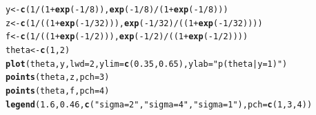 \documentclass[12pt]{article}\usepackage[]{graphicx}\usepackage[]{color}
\makeatletter
\newcommand{\hlnum}[1]{\textcolor[rgb]{0.686,0.059,0.569}{#1}}%
\newcommand{\hlstr}[1]{\textcolor[rgb]{0.192,0.494,0.8}{#1}}%
\newcommand{\hlopt}[1]{\textcolor[rgb]{0,0,0}{#1}}%
\newcommand{\hlstd}[1]{\textcolor[rgb]{0.345,0.345,0.345}{#1}}%
\newcommand{\hlkwb}[1]{\textcolor[rgb]{0.69,0.353,0.396}{#1}}%
\newcommand{\hlkwc}[1]{\textcolor[rgb]{0.333,0.667,0.333}{#1}}%
\newcommand{\hlkwd}[1]{\textcolor[rgb]{0.737,0.353,0.396}{\textbf{#1}}}%
\newenvironment{kframe}{%
 \def\at@end@of@kframe{}%
 \ifinner\ifhmode%
  \def\at@end@of@kframe{\end{minipage}}%
  \begin{minipage}{\columnwidth}%
 \fi\fi%
 \def\FrameCommand##1{\hskip\@totalleftmargin \hskip-\fboxsep
 \colorbox{shadecolor}{##1}\hskip-\fboxsep
     \hskip-\linewidth \hskip-\@totalleftmargin \hskip\columnwidth}%
 \MakeFramed {\advance\hsize-\width
   \@totalleftmargin\z@ \linewidth\hsize
   \@setminipage}}%
 {\par\unskip\endMakeFramed%
 \at@end@of@kframe}
\newenvironment{knitrout}{}{} %
\makeatother
\begin{document}
\begin{knitrout}\footnotesize
{}\color{fgcolor}\begin{kframe}
\begin{alltt}
\hlstd{y} \hlkwb{<-} \hlkwd{c}\hlstd{(}\hlnum{1}\hlopt{/}\hlstd{(}\hlnum{1}\hlopt{+}\hlkwd{exp}\hlstd{(}\hlopt{-}\hlnum{1}\hlopt{/}\hlnum{8}\hlstd{)),} \hlkwd{exp}\hlstd{(}\hlopt{-}\hlnum{1}\hlopt{/}\hlnum{8}\hlstd{)}\hlopt{/}\hlstd{(}\hlnum{1}\hlopt{+}\hlkwd{exp}\hlstd{(}\hlopt{-}\hlnum{1}\hlopt{/}\hlnum{8}\hlstd{)))}
\hlstd{z} \hlkwb{<-} \hlkwd{c}\hlstd{(}\hlnum{1}\hlopt{/}\hlstd{((}\hlnum{1}\hlopt{+}\hlkwd{exp}\hlstd{(}\hlopt{-}\hlnum{1}\hlopt{/}\hlnum{32}\hlstd{))),} \hlkwd{exp}\hlstd{(}\hlopt{-}\hlnum{1}\hlopt{/}\hlnum{32}\hlstd{)}\hlopt{/}\hlstd{((}\hlnum{1}\hlopt{+}\hlkwd{exp}\hlstd{(}\hlopt{-}\hlnum{1}\hlopt{/}\hlnum{32}\hlstd{))))}
\hlstd{f} \hlkwb{<-} \hlkwd{c}\hlstd{(}\hlnum{1}\hlopt{/}\hlstd{((}\hlnum{1}\hlopt{+}\hlkwd{exp}\hlstd{(}\hlopt{-}\hlnum{1}\hlopt{/}\hlnum{2}\hlstd{))),} \hlkwd{exp}\hlstd{(}\hlopt{-}\hlnum{1}\hlopt{/}\hlnum{2}\hlstd{)}\hlopt{/}\hlstd{((}\hlnum{1}\hlopt{+}\hlkwd{exp}\hlstd{(}\hlopt{-}\hlnum{1}\hlopt{/}\hlnum{2}\hlstd{))))}
\hlstd{theta} \hlkwb{<-} \hlkwd{c}\hlstd{(}\hlnum{1}\hlstd{,}\hlnum{2}\hlstd{)}
\hlkwd{plot}\hlstd{(theta, y,} \hlkwc{lwd}\hlstd{=}\hlnum{2}\hlstd{,} \hlkwc{ylim}\hlstd{=}\hlkwd{c}\hlstd{(}\hlnum{0.35}\hlstd{,}\hlnum{0.65}\hlstd{),} \hlkwc{ylab}\hlstd{=}\hlstr{"p(theta|y=1)"}\hlstd{)}
\hlkwd{points}\hlstd{(theta, z,} \hlkwc{pch}\hlstd{=}\hlnum{3}\hlstd{)}
\hlkwd{points}\hlstd{(theta, f,} \hlkwc{pch}\hlstd{=}\hlnum{4}\hlstd{)}
\hlkwd{legend}\hlstd{(}\hlnum{1.6}\hlstd{,}\hlnum{0.46}\hlstd{,} \hlkwd{c}\hlstd{(}\hlstr{"sigma=2"}\hlstd{,} \hlstr{"sigma=4"}\hlstd{,} \hlstr{"sigma=1"}\hlstd{),} \hlkwc{pch}\hlstd{=}\hlkwd{c}\hlstd{(}\hlnum{1}\hlstd{,}\hlnum{3}\hlstd{,}\hlnum{4}\hlstd{))}
\end{alltt}
\end{kframe}
\end{knitrout}
\end{document}
